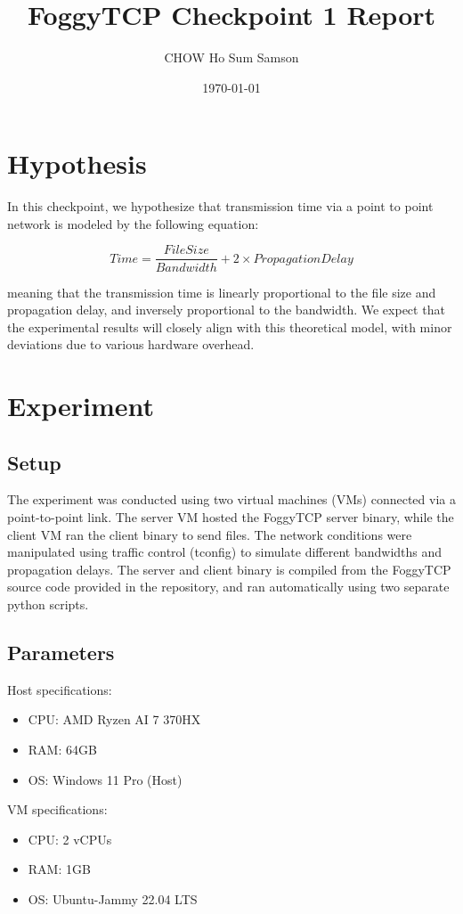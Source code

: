 \documentclass[11pt,letterpaper]{article}
\title{FoggyTCP Checkpoint 1 Report}
\author{CHOW Ho Sum Samson}
\date{\today}
\begin{document}
\maketitle

\section{Hypothesis}

In this checkpoint, we hypothesize that transmission time via a point to point 
network is modeled by the following equation:

\begin{equation}
    Time = \frac{File Size}{Bandwidth} + 2 \times Propagation Delay
\end{equation}

meaning that the transmission time is linearly proportional to the file size and propagation delay,
 and inversely proportional to the bandwidth.
  We expect that the experimental results will closely align with this theoretical model,
   with minor deviations due to various hardware overhead.



\section{Experiment}    
\subsection{Setup}
The experiment was conducted using two virtual machines (VMs) connected via a point-to-point link.
 The server VM hosted the FoggyTCP server binary, while the client VM ran the client binary to send files.
  The network conditions were manipulated using traffic control (tconfig) to simulate different bandwidths and propagation delays.
    The server and client binary is compiled from the FoggyTCP source code provided in the repository,
     and ran automatically using two separate python scripts.

\subsection{Parameters}
Host specifications:
\begin{itemize}
    \item CPU: AMD Ryzen AI 7 370HX
    \item RAM: 64GB
    \item OS: Windows 11 Pro (Host)
\end{itemize}
VM specifications:
\begin{itemize}
    \item CPU: 2 vCPUs
    \item RAM: 1GB
    \item OS: Ubuntu-Jammy 22.04 LTS
\end{itemize}
\end{document}
